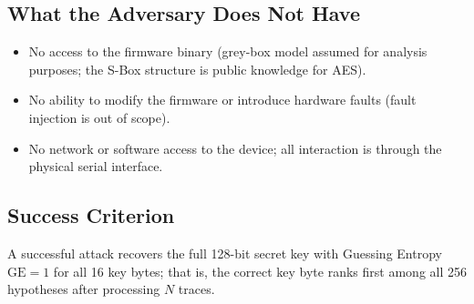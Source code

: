 \subsection{What the Adversary Does Not Have}

\begin{itemize}
  \item No access to the firmware binary (grey-box model assumed for analysis
        purposes; the S-Box structure is public knowledge for AES).
  \item No ability to modify the firmware or introduce hardware faults
        (fault injection is out of scope).
  \item No network or software access to the device; all interaction is
        through the physical serial interface.
\end{itemize}

\subsection{Success Criterion}

A successful attack recovers the full 128-bit secret key with Guessing
Entropy $\text{GE} = 1$ for all 16 key bytes; that is, the correct key byte
ranks first among all 256 hypotheses after processing $N$ traces.
